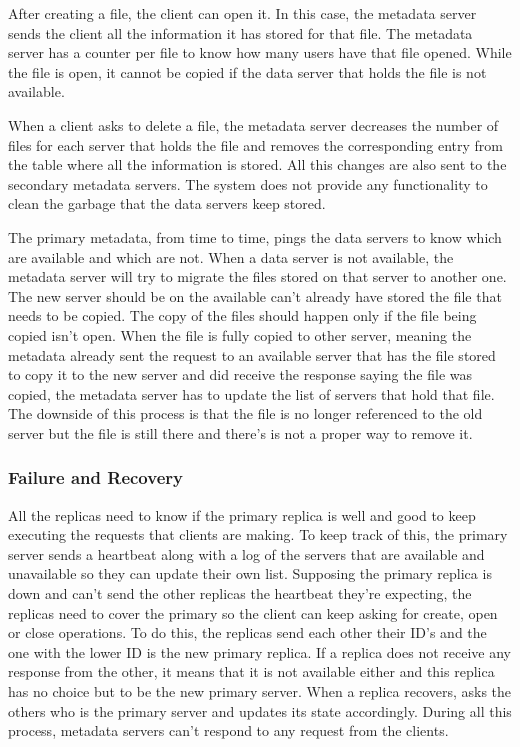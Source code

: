 After creating a file, the client can open it. In this case, the metadata 
server sends the client all the information it has stored for that file.
The metadata server has a counter per file to know how many users have 
that file opened. While the file is open, it cannot be copied if the data 
server that holds the file is not available.

When a client asks to delete a file, the metadata server decreases the
number of files for each server that holds the file and removes the 
corresponding entry from the table where all the information is stored. 
All this changes are also sent to the secondary metadata servers. 
The system does not provide any functionality to clean the garbage that 
the data servers keep stored.

The primary metadata, from time to time, pings the data servers to know 
which are available and which are not. When a data server is not 
available, the metadata server will try to migrate the files stored on 
that server to another one. The new server should be on the available 
can't already have stored the file that needs to be copied. The 
copy of the files should happen only if the file being copied isn't open. When 
the file is fully copied to other server, meaning the metadata already sent 
the request to an available server that has the file stored to copy it to the new 
server and did receive the response saying the file was copied, the metadata 
server has to update the list of servers that hold that file. The downside 
of this process is that the file is no longer referenced to the old server 
but the file is still there and there's is not a proper way to remove it.

\subsubsection{Failure and Recovery}

All the replicas need to know if the primary replica is well and good to 
keep executing the requests that clients are making. To keep track of this, 
the primary server sends a heartbeat along with a log of the servers that 
are available and unavailable so they can update their own list. Supposing 
the primary replica is down and can't send the other replicas the heartbeat 
they're expecting, the replicas need to cover the primary so the client can 
keep asking for create, open or close operations. To do this, the replicas 
send each other their ID's and the one with the lower ID is the new primary
replica. If a replica does not receive any response from the other, it 
means that it is not available either and this replica has no choice but to 
be the new primary server. When a replica recovers, asks the others who is 
the primary server and updates its state accordingly. During all this process, 
metadata servers can't respond to any request from the clients.